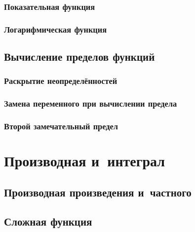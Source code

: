 \documentclass[14pt, oneside]{extbook}
\begin{document}
\subsection{Показательная функция}

\subsection{Логарифмическая функция}

\section{Вычисление пределов функций}
\subsection{Раскрытие неопределённостей}

\subsection{Замена переменного при вычислении предела}

\subsection{Второй замечательный предел}



\chapter{Производная и~интеграл}

\section{Производная произведения и~частного}

\section{Сложная функция}

\end{document}
